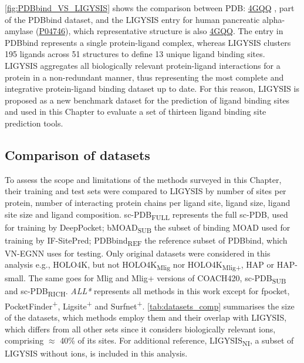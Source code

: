 \autoref{fig:PDBbind_VS_LIGYSIS} shows the comparison between PDB: \href{https://www.ebi.ac.uk/pdbe/entry/pdb/4GQQ}{4GQQ} \cite{WILLIAMS_2012_AMYLASE}, part of the PDBbind dataset, and the LIGYSIS entry for human pancreatic alpha-amylase (\href{https://www.uniprot.org/uniprotkb/P04746/entry}{P04746}), which representative structure is also \href{https://www.ebi.ac.uk/pdbe/entry/pdb/4GQQ}{4GQQ}. The entry in PDBbind represents a single protein-ligand complex, whereas LIGYSIS clusters 195 ligands across 51 structures to define 13 unique ligand binding sites. LIGYSIS aggregates all biologically relevant protein-ligand interactions for a protein in a non-redundant manner, thus representing the most complete and integrative protein-ligand binding dataset up to date. For this reason, LIGYSIS is proposed as a new benchmark dataset for the prediction of ligand binding sites and used in this Chapter to evaluate a set of thirteen ligand binding site prediction tools.

\subsection{Comparison of datasets}

To assess the scope and limitations of the methods surveyed in this Chapter, their training and test sets were compared to LIGYSIS by number of sites per protein, number of interacting protein chains per ligand site, ligand size, ligand site size and ligand composition. sc-PDB\textsubscript{FULL} represents the full sc-PDB, used for training by DeepPocket; bMOAD\textsubscript{SUB} the subset of binding MOAD used for training by IF-SitePred; PDBbind\textsubscript{REF} the reference subset of PDBbind, which VN-EGNN uses for testing. Only original datasets were considered in this analysis e.g., HOLO4K, but not HOLO4K\textsubscript{Mlig} nor HOLO4K\textsubscript{Mlig+}, HAP or HAP-small. The same goes for Mlig and Mlig+ versions of COACH420, sc-PDB\textsubscript{SUB} and sc-PDB\textsubscript{RICH}. \textit{ALL*} represents all methods in this work except for fpocket, PocketFinder\textsuperscript{+}, Ligsite\textsuperscript{+} and Surfnet\textsuperscript{+}. \autoref{tab:datasets_comp} summarises the size of the datasets, which methods employ them and their overlap with LIGYSIS, which differs from all other sets since it considers biologically relevant ions, comprising $\approx$ 40\% of its sites. For additional reference, LIGYSIS\textsubscript{NI}, a subset of LIGYSIS without ions, is included in this analysis. 

